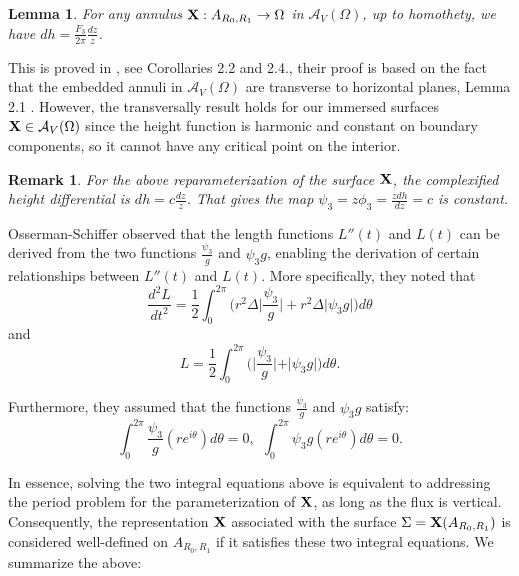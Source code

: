 \documentclass[11pt]{amsart}
\newtheorem{lem}[thm]{Lemma}
\newtheorem{rem}[thm]{\bf{Remark}}
\numberwithin{equation}{section}
\theoremstyle{theorem}
\theoremstyle{definition}
\numberwithin{equation}{section}
\begin{document}
\begin{lem} \label{lem: good repn}
    For any annulus $\bold{X}: A_{R_0,R_1} \rightarrow \Omega$ in $\mathcal{A}_V(\Omega)$, up to homothety, we have $dh = \frac{F_3}{2\pi} \frac{dz}{z}$.
\end{lem}
This is proved in \cite{bernstein2014variational}, see Corollaries 2.2 and 2.4., their proof is based on the fact that the embedded annuli in $\mathcal{A}_V(\Omega)$ are transverse to horizontal planes, Lemma 2.1 \cite{bernstein2014variational}. However, the transversally result holds for our immersed surfaces $\bold{X} \in \mathcal{A}_V(\Omega)$ since the height function is harmonic and constant on boundary components, so it cannot have any critical point on the interior.

\begin{rem} \label{rmk: good repn}
    \rm  For the above reparameterization of the surface $\bold{X}$, the complexified height differential is $dh=c\frac{dz}{z}$. That gives the map $\psi_3=z\phi_3=\frac{zdh}{dz}=c$ is constant.
\end{rem}

Osserman-Schiffer \cite{osserman1975doubly} observed that the length functions $L''(t)$ and $L(t)$ can be derived from the two functions $\frac{\psi_3}{g}$ and $\psi_3g$, enabling the derivation of certain relationships between $L''(t)$ and $L(t)$. More specifically, they noted that 
\begin{equation}\label{L"}
    \frac{d^2L}{dt^2} = \frac{1}{2} \int_{0}^{2\pi} \big( r^2\Delta \vert \frac{\psi_3}{g} \vert + r^2\Delta \vert \psi_3 g\vert  \big) d\theta 
\end{equation} 
and 
\begin{equation}\label{L}
    L=\frac{1}{2} \int_{0}^{2\pi} \big( \vert \frac{\psi_3}{g} \vert +  \vert \psi_3 g\vert  \big) d\theta .
\end{equation}

Furthermore, they assumed that the functions $\frac{\psi_3}{g}$ and $ \psi_3 g$ satisfy:
\begin{equation} \label{eqn: int, pp}
    \int_{0}^{2\pi} \frac{\psi_3}{g} (re^{i\theta})d\theta = 0, \  \ \int_{0}^{2\pi} \psi_3 g (re^{i\theta})d\theta = 0.
\end{equation}

In essence, solving the two integral equations above is equivalent to addressing the period problem for the parameterization of $\bold{X}$, as long as the flux is vertical. Consequently, the representation $\bold{X}$ associated with the surface $\Sigma=\bold{X}(A_{R_0,R_1})$ is considered well-defined on $A_{R_0,R_1}$ if it satisfies these two integral equations. We summarize the above:
\end{document}
